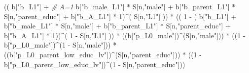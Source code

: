 \documentclass[
]{book}
\newenvironment{Shaded}{\begin{snugshade}}{\end{snugshade}}
\newcommand{\CommentTok}[1]{\textcolor[rgb]{0.56,0.35,0.01}{\textit{#1}}}
\newcommand{\DecValTok}[1]{\textcolor[rgb]{0.00,0.00,0.81}{#1}}
\newcommand{\NormalTok}[1]{#1}
\newcommand{\SpecialCharTok}[1]{\textcolor[rgb]{0.00,0.00,0.00}{#1}}
\newcommand{\StringTok}[1]{\textcolor[rgb]{0.31,0.60,0.02}{#1}}
\begin{document}
\begin{Shaded}
\begin{Highlighting}[]
\NormalTok{      (( b[}\StringTok{"b\_L1"}\NormalTok{] }\SpecialCharTok{+}                                                            \CommentTok{\# A=1}
\NormalTok{           b[}\StringTok{"b\_male\_L1"}\NormalTok{] }\SpecialCharTok{*}\NormalTok{ S[n,}\StringTok{"male"}\NormalTok{] }\SpecialCharTok{+}  
\NormalTok{           b[}\StringTok{"b\_parent\_L1"}\NormalTok{] }\SpecialCharTok{*}\NormalTok{ S[n,}\StringTok{"parent\_educ"}\NormalTok{] }\SpecialCharTok{+}
\NormalTok{           b[}\StringTok{"b\_A\_L1"}\NormalTok{] }\SpecialCharTok{*} \DecValTok{1}\NormalTok{)}\SpecialCharTok{\^{}}\NormalTok{( S[n,}\StringTok{"L1"}\NormalTok{] )) }\SpecialCharTok{*}
\NormalTok{      (( }\DecValTok{1} \SpecialCharTok{{-}}\NormalTok{ ( b[}\StringTok{"b\_L1"}\NormalTok{] }\SpecialCharTok{+}
\NormalTok{                 b[}\StringTok{"b\_male\_L1"}\NormalTok{] }\SpecialCharTok{*}\NormalTok{ S[n,}\StringTok{"male"}\NormalTok{] }\SpecialCharTok{+}  
\NormalTok{                 b[}\StringTok{"b\_parent\_L1"}\NormalTok{] }\SpecialCharTok{*}\NormalTok{ S[n,}\StringTok{"parent\_educ"}\NormalTok{] }\SpecialCharTok{+}
\NormalTok{                 b[}\StringTok{"b\_A\_L1"}\NormalTok{] }\SpecialCharTok{*} \DecValTok{1}\NormalTok{))}\SpecialCharTok{\^{}}\NormalTok{( }\DecValTok{1} \SpecialCharTok{{-}}\NormalTok{ S[n,}\StringTok{"L1"}\NormalTok{] )) }\SpecialCharTok{*}
\NormalTok{      ((b[}\StringTok{"p\_L0\_male"}\NormalTok{])}\SpecialCharTok{\^{}}\NormalTok{(S[n,}\StringTok{"male"}\NormalTok{])) }\SpecialCharTok{*} 
\NormalTok{      ((}\DecValTok{1} \SpecialCharTok{{-}}\NormalTok{ b[}\StringTok{"p\_L0\_male"}\NormalTok{])}\SpecialCharTok{\^{}}\NormalTok{(}\DecValTok{1} \SpecialCharTok{{-}}\NormalTok{ S[n,}\StringTok{"male"}\NormalTok{])) }\SpecialCharTok{*} 
\NormalTok{      ((b[}\StringTok{"p\_L0\_parent\_low\_educ\_lv"}\NormalTok{])}\SpecialCharTok{\^{}}\NormalTok{(S[n,}\StringTok{"parent\_educ"}\NormalTok{])) }\SpecialCharTok{*}
\NormalTok{      ((}\DecValTok{1} \SpecialCharTok{{-}}\NormalTok{ b[}\StringTok{"p\_L0\_parent\_low\_educ\_lv"}\NormalTok{])}\SpecialCharTok{\^{}}\NormalTok{(}\DecValTok{1} \SpecialCharTok{{-}}\NormalTok{ S[n,}\StringTok{"parent\_educ"}\NormalTok{])) }
    

\end{Highlighting}
\end{Shaded}
\end{document}

